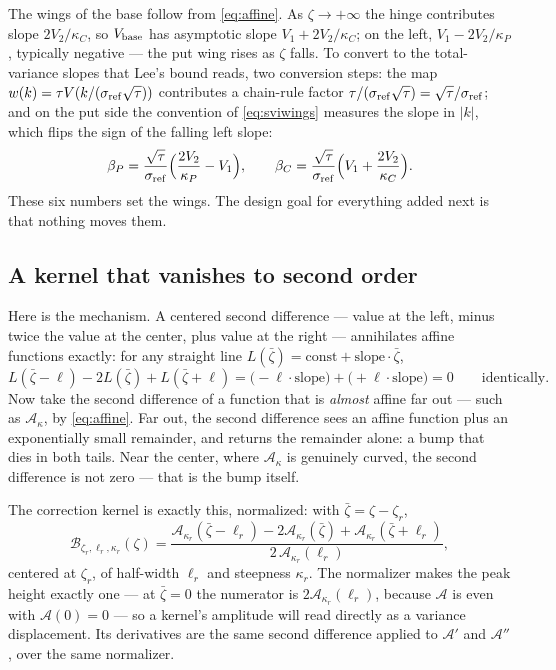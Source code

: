 The wings of the base follow from \eqref{eq:affine}.  As
$\zeta\to+\infty$ the hinge contributes slope $2V_2/\kappa_C$, so
$V_{\rm base}$ has asymptotic slope $V_1+2V_2/\kappa_C$; on the left,
$V_1-2V_2/\kappa_P$, typically negative --- the put wing rises as
$\zeta$ falls.  To convert to the total-variance slopes that Lee's
bound reads, two conversion steps: the map
$w(k)=\tau V(k/(\sigma_{\rm ref}\sqrt\tau))$ contributes a chain-rule
factor $\tau/(\sigma_{\rm ref}\sqrt\tau)=\sqrt\tau/\sigma_{\rm ref}$;
and on the put side the convention of \eqref{eq:sviwings} measures the
slope in $|k|$, which flips the sign of the falling left slope:
\begin{equation}
\beta_P=\frac{\sqrt\tau}{\sigma_{\rm ref}}
\Big(\frac{2V_2}{\kappa_P}-V_1\Big),
\qquad
\beta_C=\frac{\sqrt\tau}{\sigma_{\rm ref}}
\Big(V_1+\frac{2V_2}{\kappa_C}\Big).
\label{eq:mcsbetak}
\end{equation}
These six numbers set the wings.  The design goal for everything added
next is that nothing moves them.

\subsection{A kernel that vanishes to second order}

Here is the mechanism.  A centered second difference --- value at the
left, minus twice the value at the center, plus value at the right ---
annihilates affine functions exactly: for any straight line
$L(\bar\zeta)=\text{const}+\text{slope}\cdot\bar\zeta$,
\[
L(\bar\zeta-\ell)-2L(\bar\zeta)+L(\bar\zeta+\ell)
=\big(-\ell\cdot\text{slope}\big)+\big(+\ell\cdot\text{slope}\big)=0
\qquad\text{identically.}
\]
Now take the second difference of a function that is \emph{almost}
affine far out --- such as $\mathcal{A}_\kappa$, by \eqref{eq:affine}.
Far out, the second difference sees an affine function plus an
exponentially small remainder, and returns the remainder alone: a bump
that dies in both tails.  Near the center, where $\mathcal{A}_\kappa$
is genuinely curved, the second difference is not zero --- that is the
bump itself.

The correction kernel is exactly this, normalized: with
$\bar\zeta=\zeta-\zeta_r$,
\begin{equation}
\mathcal{B}_{\zeta_r,\ell_r,\kappa_r}(\zeta)
=\frac{\mathcal{A}_{\kappa_r}(\bar\zeta-\ell_r)
-2\mathcal{A}_{\kappa_r}(\bar\zeta)
+\mathcal{A}_{\kappa_r}(\bar\zeta+\ell_r)}
{2\,\mathcal{A}_{\kappa_r}(\ell_r)},
\label{eq:hatdef}
\end{equation}
centered at $\zeta_r$, of half-width $\ell_r$ and steepness $\kappa_r$.
The normalizer makes the peak height exactly one --- at
$\bar\zeta=0$ the numerator is
$2\mathcal{A}_{\kappa_r}(\ell_r)$, because $\mathcal{A}$ is even with
$\mathcal{A}(0)=0$ --- so a kernel's amplitude will read directly as a
variance displacement.  Its derivatives are the same second difference
applied to $\mathcal{A}'$ and $\mathcal{A}''$, over the same
normalizer.

